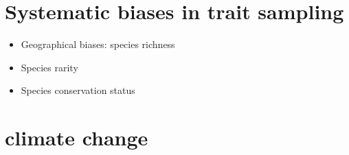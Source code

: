 \section{Systematic biases in trait sampling}

\begin{itemize}
\item Geographical biases: species richness
\item Species rarity
\item Species conservation status
\end{itemize}

\section{}

\section{climate change}